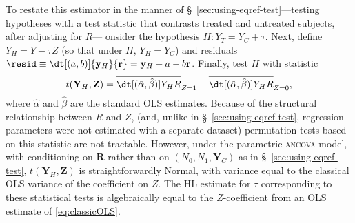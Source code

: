 To restate this estimator in the manner of
\S~\ref{sec:using-eqref-test}---testing hypotheses with a test
statistic that contrasts treated and untreated subjects, after
adjusting for $R$---
onsider the hypothesis $H: Y_{T} = Y_{C} + \tau$.
Next, define ${{Y}_H} = {Y} - \tau {Z}$ (so that under $H$, $Y_H=Y_C$)
and residuals $\resid\equiv\dt[(a, b)]{\mathbf{y}_{H}}{ \mathbf{r}} = {\mathbf{y}_H} - a -
b\mathbf{r}$.
Finally, test $H$ with statistic
\begin{equation*}
t(\mathbf{Y}_H , \mathbf{Z}) =
\overline{\dt[(\hat{\alpha},\hat{\beta})]{{{Y}_H}}{ {R}}}_{Z=1} -
\overline{\dt[(\hat{\alpha},\hat{\beta})]{{{Y}_H}}{ {R}}}_{Z=0},
\end{equation*}
where $\hat{\alpha}$ and $\hat{\beta}$ are the standard OLS estimates.
Because of the structural relationship
between $R$ and $Z$, (and, unlike in
\S~\ref{sec:using-eqref-test}, regression parameters were not estimated
with a separate dataset) 
permutation tests based on this statistic are not tractable. 
However, under the parametric \textsc{ancova} model, with
conditioning on $\mathbf{R}$ rather than on $(N_{0}, N_{1},
\mathbf{Y}_{C})$ as in \S~\ref{sec:using-eqref-test},
$t(\mathbf{Y}_H , \mathbf{Z})$ is straightforwardly Normal, with
variance equal to the classical OLS variance of the coefficient on
$Z$. 
The HL estimate for $\tau$ corresponding to these statistical tests is
algebraically equal to the $Z$-coefficient from an OLS estimate of
\eqref{eq:classicOLS}.  

